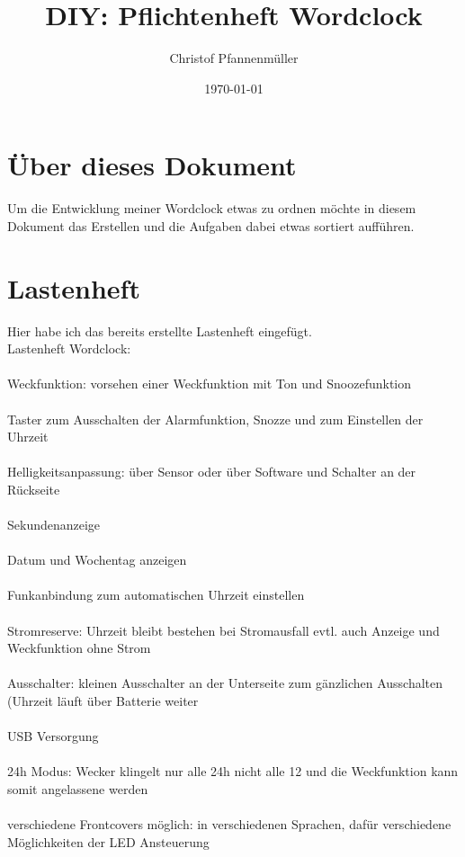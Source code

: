 \documentclass[11pt,a4paper,ngerman]{article}
\date{\today}
\author{Christof Pfannenmüller}
\title{DIY: Pflichtenheft Wordclock}
\begin{document}
 \maketitle
\tableofcontents 
\section{Über dieses Dokument}
Um die Entwicklung meiner Wordclock etwas zu ordnen möchte in diesem Dokument das Erstellen und die Aufgaben dabei etwas sortiert aufführen.
\section{Lastenheft}
{\large Hier habe ich das bereits erstellte Lastenheft eingefügt.  }\\
Lastenheft Wordclock:\\
\\
Weckfunktion: vorsehen einer Weckfunktion mit Ton und Snoozefunktion\\
\\
Taster zum Ausschalten der Alarmfunktion, Snozze und zum Einstellen der Uhrzeit\\
\\
Helligkeitsanpassung: über Sensor oder über Software und Schalter an der Rückseite\\
\\
Sekundenanzeige\\
\\
Datum und Wochentag anzeigen\\
\\
Funkanbindung zum automatischen Uhrzeit einstellen\\
\\
Stromreserve: Uhrzeit bleibt bestehen bei Stromausfall  evtl. auch Anzeige und Weckfunktion ohne Strom\\
\\
Ausschalter: kleinen Ausschalter an der Unterseite zum gänzlichen Ausschalten (Uhrzeit läuft über Batterie weiter\\
\\
USB Versorgung\\
\\
24h Modus: Wecker klingelt nur alle 24h nicht alle 12 und die Weckfunktion kann somit angelassene werden\\
\\
verschiedene Frontcovers möglich: in verschiedenen Sprachen, dafür verschiedene Möglichkeiten der LED Ansteuerung\\
\\
\end{document}
